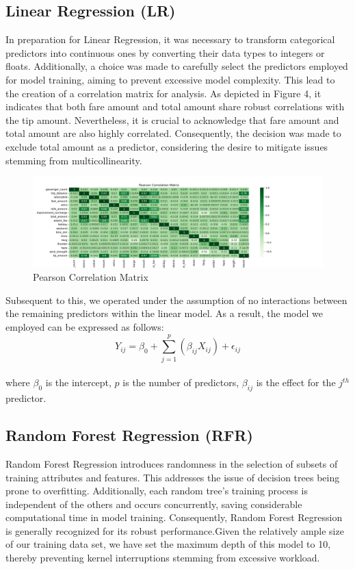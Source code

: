 \documentclass[11pt]{article}
\begin{document}
\subsection{Linear Regression (LR)}
In preparation for Linear Regression, it was necessary to transform categorical predictors into continuous ones by converting their data types to integers or floats. Additionally, a choice was made to carefully select the predictors employed for model training, aiming to prevent excessive model complexity. This lead to the creation of a correlation matrix for analysis. As depicted in Figure 4, it indicates that both fare amount and total amount share robust correlations with the tip amount. Nevertheless, it is crucial to acknowledge that fare amount and total amount are also highly correlated. Consequently, the decision was made to exclude total amount as a predictor, considering the desire to mitigate issues stemming from multicollinearity. 
\begin{figure}[h]
    \centering
    \includegraphics[width=1.32\textwidth]{plots/Pearson_Correlation_Matrix.png}
    \caption{Pearson Correlation Matrix}  
\end{figure} 
Subsequent to this, we operated under the assumption of no interactions between the remaining predictors within the linear model. As a result, the model we employed can be expressed as follows:
\begin{equation}
    Y_{ij} = \beta_0 + \sum_{j=1}^{p}(\beta_{ij} X_{ij}) + \epsilon_{ij}
\end{equation}\\
where $\beta_0$ is the intercept, $p$ is the number of predictors, $\beta_{ij}$ is the effect for the $j^{th}$ predictor.
\subsection{Random Forest Regression (RFR)}
Random Forest Regression introduces randomness in the selection of subsets of training attributes and features. This addresses the issue of decision trees being prone to overfitting. Additionally, each random tree's training process is independent of the others and occurs concurrently, saving considerable computational time in model training. Consequently, Random Forest Regression is generally recognized for its robust performance.Given the relatively ample size of our training data set, we have set the maximum depth of this model to 10, thereby preventing kernel interruptions stemming from excessive workload.
\end{document}
